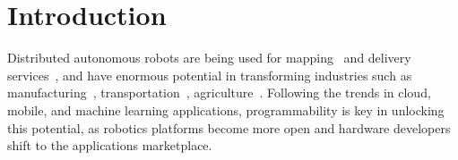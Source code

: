 
\section{Introduction}
\label{sec:intro}

Distributed autonomous robots are being used for   mapping~\cite{thrun2002robotic} and delivery services~\cite{mosterman2014heterogeneous}, and have enormous potential in transforming industries such as  manufacturing~\cite{pires2000object,gauthier1987interprocess}, transportation~\cite{gerla2014internet,guo2012autonomous}, agriculture~\cite{blender2016managing,r2018research}. Following the trends in cloud, mobile, and machine learning applications, programmability is key in unlocking this potential, as robotics platforms become more open and hardware developers shift to the applications marketplace.\vspace{-2mm}
